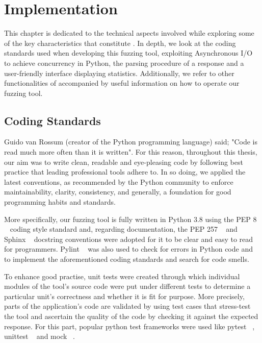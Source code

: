 \chapter{Implementation}
\label{sec:implementation}
\minitoc
\vspace*{1cm}

This chapter is dedicated to the technical aspects involved while exploring some of the key characteristics that constitute \pname{}. In depth, we look at the coding standards used when developing this fuzzing tool, exploiting Asynchronous I/O to achieve concurrency in Python, the parsing procedure of a response and a user-friendly interface displaying statistics. Additionally, we refer to other functionalities of \pname{} accompanied by useful information on how to operate our fuzzing tool.

\section{Coding Standards}
Guido van Rossum (creator of the Python programming language) said; "Code is read much more often than it is written". For this reason, throughout this thesis, our aim was to write clean, readable and eye-pleasing code by following best practice that leading professional tools adhere to. In so doing, we applied the latest conventions, as recommended by the Python community to enforce maintainability, clarity, consistency, and generally, a foundation for good programming habits and standards. 

More specifically, our fuzzing tool is fully written in Python 3.8 using the PEP 8 ~\cite{python_pep8} coding style standard and, regarding documentation, the PEP 257 ~\cite{python_pep257} and Sphinx ~\cite{sphinx} docstring conventions were adopted for it to be clear and easy to read for programmers. Pylint ~\cite{pylint_module} was also used to check for errors in Python code and to implement the aforementioned coding standards and search for code smells.

To enhance good practise, unit tests were created through which individual modules of the tool's source code were put under different tests to determine a particular unit's correctness and whether it is fit for purpose. More precisely, parts of the application's code are validated by using test cases that stress-test the tool and ascertain the quality of the code by checking it against the expected response. For this part, popular python test frameworks were used like pytest ~\cite{pytest_module}, unittest ~\cite{unittest_module} and mock ~\cite{mock}.

